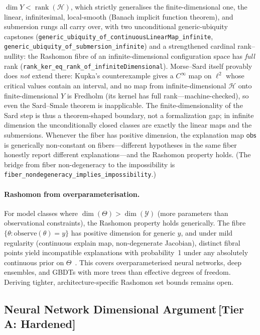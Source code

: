 \documentclass[11pt,a4paper]{article}
\newcommand{\sH}{\mathcal{H}}
\begin{document}
$\dim Y < \operatorname{rank}(\sH)$, which strictly generalises the finite-dimensional one, the
linear, infinitesimal, local-smooth (Banach implicit function theorem), and submersion rungs all
carry over, with two unconditional generic-ubiquity capstones
(\texttt{generic\_ubiquity\_of\_continuousLinearMap\_infinite},
\texttt{generic\_ubiquity\_of\_submersion\_infinite}) and a strengthened cardinal rank--nullity:
the Rashomon fibre of an infinite-dimensional configuration space has \emph{full} rank
(\texttt{rank\_ker\_eq\_rank\_of\_infiniteDimensional}).  Morse--Sard itself provably does
\emph{not} extend there: Kupka's counterexample \citep{kupka1965counterexample} gives a $C^\infty$
map on $\ell^2$ whose critical values contain an interval, and no map from infinite-dimensional
$\sH$ onto finite-dimensional $Y$ is Fredholm (its kernel has full rank---machine-checked), so even
the Sard--Smale theorem \citep{smale1965infinite} is inapplicable.
The finite-dimensionality of the Sard step is thus a theorem-shaped boundary, not a
formalization gap; in infinite dimension the unconditionally closed classes are exactly the
linear maps and the submersions.
Whenever the fiber has positive dimension, the explanation map
$\mathsf{obs}$ is generically non-constant on fibers---different hypotheses
in the same fiber honestly report different explanations---and the Rashomon
property holds.  (The bridge from fiber non-degeneracy to the
impossibility is \texttt{fiber\_nondegeneracy\_implies\_impossibility}.)

\paragraph{Rashomon from overparameterisation.}
For model classes where $\dim(\Theta) > \dim(\mathcal{Y})$ (more parameters than observational constraints), the Rashomon property holds generically. The fibre $\{\theta : \text{observe}(\theta) = y\}$ has positive dimension for generic $y$, and under mild regularity (continuous explain map, non-degenerate Jacobian), distinct fibral points yield incompatible explanations with probability~1 under any absolutely continuous prior on $\Theta$~\citep{damour2022underspecification}. This covers overparameterised neural networks, deep ensembles, and GBDTs with more trees than effective degrees of freedom. Deriving tighter, architecture-specific Rashomon set bounds remains open.

\subsection{Neural Network Dimensional Argument\,\textnormal{\normalsize[Tier A: Hardened]}}
\label{sec:nn-dimensional}
\end{document}
